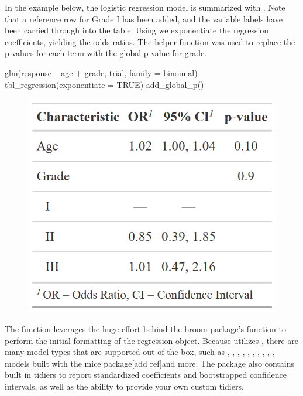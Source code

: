In the example below, the logistic regression model is summarized with .
Note that a reference row for Grade I has been added, and the variable labels have been carried through into the table.
Using   we exponentiate the regression coefficients, yielding the odds ratios.
The helper function  was used to replace the p-values for each term with the global p-value for grade.

\newpage
\begin{example}
glm(response ~ age + grade, trial, family = binomial) %
  tbl_regression(exponentiate = TRUE) %
  add_global_p()
\end{example}

\begin{figure}[h!]
  \includegraphics[scale=0.35]{regression.png}
  \centering
\end{figure}

The  function leverages the huge effort behind the broom package's  function \citep{broom} to perform the initial formatting of the regression object.
Because  utilizes , there are many model types that are supported out of the box, such as , , , , , , , , , , models built with the mice package[add ref]and more. The  package also contains built in tidiers to report standardized coefficients and bootstrapped confidence intervals, as well as the ability to provide your own custom tidiers.

